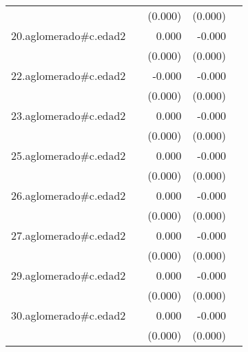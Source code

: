 {\begin{longtable}{l*{4}{D{.}{.}{-1}}}
            &                     &     (0.000)         &     (0.000)         &                     \\
\addlinespace
20.aglomerado#c.edad2&                     &       0.000         &      -0.000         &                     \\
            &                     &     (0.000)         &     (0.000)         &                     \\
\addlinespace
22.aglomerado#c.edad2&                     &      -0.000         &      -0.000\sym{**} &                     \\
            &                     &     (0.000)         &     (0.000)         &                     \\
\addlinespace
23.aglomerado#c.edad2&                     &       0.000         &      -0.000         &                     \\
            &                     &     (0.000)         &     (0.000)         &                     \\
\addlinespace
25.aglomerado#c.edad2&                     &       0.000         &      -0.000         &                     \\
            &                     &     (0.000)         &     (0.000)         &                     \\
\addlinespace
26.aglomerado#c.edad2&                     &       0.000         &      -0.000         &                     \\
            &                     &     (0.000)         &     (0.000)         &                     \\
\addlinespace
27.aglomerado#c.edad2&                     &       0.000         &      -0.000         &                     \\
            &                     &     (0.000)         &     (0.000)         &                     \\
\addlinespace
29.aglomerado#c.edad2&                     &       0.000         &      -0.000         &                     \\
            &                     &     (0.000)         &     (0.000)         &                     \\
\addlinespace
30.aglomerado#c.edad2&                     &       0.000         &      -0.000         &                     \\
            &                     &     (0.000)         &     (0.000)         &                     \\

\end{longtable}}

